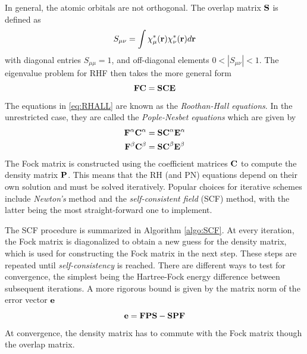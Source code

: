 In general, the atomic orbitals are not orthogonal. The overlap matrix $\mathbf{S}$ is defined as 
\begin{equation}
S_{\mu\nu} = \int \chi_{\mu}^*(\mathbf{r}) \chi_{\nu}^*(\mathbf{r}) d\mathbf{r}
\end{equation}
\noindent with diagonal entries $S_{\mu\mu} = 1$, and off-diagonal elements $0 < \left\lvert S_{\mu\nu} \right\rvert < 1$. The eigenvalue problem for RHF then takes the more general form
\begin{equation}
\mathbf{F} \mathbf{C} = \mathbf{SC} \mathbf{E}
\label{eq:RHALL}
\end{equation}
\noindent The equations in \ref{eq:RHALL} are known as the \emph{Roothan-Hall equations}. In the unrestricted case, they are called the \emph{Pople-Nesbet equations} which are given by
\begin{align}
\mathbf{F}^{\alpha} \mathbf{C}^{\alpha} &= \mathbf{SC}^{\alpha} \mathbf{E}^{\alpha} \\
\mathbf{F}^{\beta} \mathbf{C}^{\beta} &= \mathbf{SC}^{\beta} \mathbf{E}^{\beta}
\end{align}  
\noindent The Fock matrix is constructed using the coefficient matrices $\mathbf{C}$ to compute the density matrix $\mathbf{P}$. This means that the RH (and PN) equations depend on their own solution and must be solved iteratively. Popular choices for iterative schemes include \emph{Newton's} method and the \emph{self-consistent field} (SCF) method, with the latter being the most straight-forward one to implement. 

The SCF procedure is summarized in Algorithm \ref{algo:SCF}. At every iteration, the Fock matrix is diagonalized to obtain a new guess for the density matrix, which is used for constructing the Fock matrix in the next step. These steps are repeated until \emph{self-consistency} is reached. There are different ways to test for convergence, the simplest being the Hartree-Fock energy difference between subsequent iterations. A more rigorous bound is given by the matrix norm of the error vector $\mathbf{e}$
\begin{equation}
\mathbf{e} = \mathbf{FPS} - \mathbf{SPF} 
\end{equation}
\noindent At convergence, the density matrix has to commute with the Fock matrix though the overlap matrix. 

